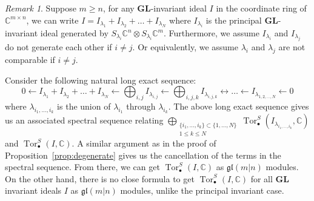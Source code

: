 \documentclass[12pt]{amsart}
\theoremstyle{definition}
\theoremstyle{remark}
\newtheorem{rmk}[thm]{Remark}
\newcommand{\bbC}{\mathbb{C}}
\newcommand{\dsum}{\bigoplus}
\newcommand{\GL}{\mathbf{GL}}
\newcommand{\gl}{\mathfrak{gl}}
\newcommand{\Tor}{\operatorname{Tor}}
\numberwithin{equation}{section}
\begin{document}
\begin{rmk}
Suppose $m \geq n$, for any $\GL$-invariant ideal $I$ in the coordinate ring of $\bbC^{m \times n}$, we can write $I = I_{\lambda_1} + I_{\lambda_2} + \ldots + I_{\lambda_N}$ where $I_{\lambda_i}$ is the principal $\GL$-invariant ideal generated by $S_{\lambda_i} \bbC^n \otimes S_{\lambda_i} \bbC^m$. Furthermore, we assume $I_{\lambda_i}$ and $I_{\lambda_j}$ do not generate each other if $i \neq j$. Or equivalently, we assume $\lambda_i$ and $\lambda_j$ are not comparable if $i \neq j$. 

Consider the following natural long exact sequence: 
\[
0 \longleftarrow I_{\lambda_1} + I_{\lambda_2} + \ldots + I_{\lambda_N} \longleftarrow \dsum_{i,j} I_{\lambda_{i,j}} \longleftarrow \dsum_{i,j,k} I_{\lambda_{i,j,k}} \longleftrightarrow \ldots \longleftarrow I_{\lambda_{1,2,\ldots,N}} \longleftarrow 0
\]
where $\lambda_{i_1,\ldots,i_k}$ is the union of $\lambda_{i_1}$ through $\lambda_{i_k}$. The above long exact sequence gives us an associated spectral sequence relating $\dsum_{\substack{\{i_1,\ldots,i_k\} \subset \{1,\ldots,N\} \\ 1 \leq k \leq N}} \Tor_{\bullet}^S(I_{\lambda_{i_1,\ldots,i_k}},\bbC)$ and $\Tor^S_{\bullet}(I,\bbC)$. A similar argument as in the proof of Proposition~\ref{prop:degenerate} gives us the cancellation of the terms in the spectral sequence. From there, we can get $\Tor^S_{\bullet}(I,\bbC)$ as $\gl(m|n)$ modules. On the other hand, there is no close formula to get $\Tor^S_{\bullet}(I,\bbC)$ for all $\GL$ invariant ideals $I$ as $\gl(m|n)$ modules, unlike the principal invariant case.
\end{rmk}
\end{document}
